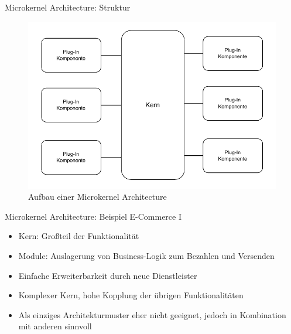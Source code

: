 \begin{frame}{Microkernel Architecture: Struktur}
    \begin{figure}[!h]
        \centering
        \includegraphics[scale=0.55]{imglib/microkernel/microkernel}
        \caption{Aufbau einer Microkernel Architecture}
        \label{fig:microkernel}
    \end{figure}
\end{frame}

\begin{frame}{Microkernel Architecture: Beispiel E-Commerce I}
    \begin{itemize}
        \item Kern: Großteil der Funktionalität
        \item Module: Auslagerung von Business-Logik zum Bezahlen und Versenden
        \item Einfache Erweiterbarkeit durch neue Dienstleister
        \item Komplexer Kern, hohe Kopplung der übrigen Funktionalitäten
        \item Als einziges Architekturmuster eher nicht geeignet, jedoch in Kombination mit anderen sinnvoll
    \end{itemize}
\end{frame}

